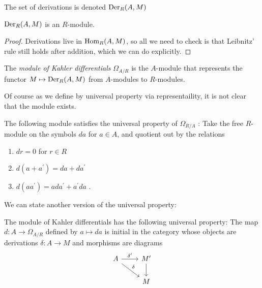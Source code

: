 The set of derivations is denoted \(\operatorname{Der}_{R}(A,M)\)

\begin{lemma} \label{lem:derivations_are_a_module}
	\(\operatorname{Der}_{R}(A,M)\) is an \(R\)-module.
\end{lemma}

\begin{proof}
	Derivations live in \(\operatorname{Hom}_{R} (A,M)\),
	so all we need to check is that 
	Leibnitz' rule still holds after addition,
	which we can do explicitly.
\end{proof}

\begin{definition} \label{def:kahler_diff_module_representable}
	The \textit{module of Kahler differentials}
	\(\Omega_{A / R}\) is the \(A\)-module that represents
	the functor \(M \mapsto \operatorname{Der}_{R}(A,M)\) 
	from \(A\)-modules to \(R\)-modules.
\end{definition}

Of course as we define by universal property via representaility,
it is not clear that the module exists.

\begin{lemma} \label{lem:explicit_kahler_diff_free_quotient}

	The following module satisfies the universal property 
	of \(\Omega_{R / A}\) :
	Take the free \(R\)-module on the symbols 
	\(da\) for \(a \in A\), and quotient
	out by the relations
	\begin{enumerate}[(1)]
		\item \(dr = 0\) for \(r \in R\) 
		\item \(d(a + a^{\prime}) = da + da^{\prime}\)
		\item \(d(aa^{\prime}) = 
			ada^{\prime} + a^{\prime}da\)
	.\end{enumerate}
\end{lemma}

We can state another version of the universal property:

\begin{lemma} \label{lem:kahler_diff_univ_prop}

	The module of Kahler differentials has the following
	universal property: 
	The map \(d : A \to \Omega_{A / R}\) 
	defined by \(a \mapsto da\)
	is initial in
	the category whose objects are 
	derivations \(\delta : A \to M\) and
	morphisms are diagrams
	\[
	\begin{tikzcd}
	A \arrow{r}{\delta^{\prime}} \arrow{rd}{\delta} & 
	M^{\prime} \arrow{d}{} \\
	& M
	\end{tikzcd}
	\]
\end{lemma}


